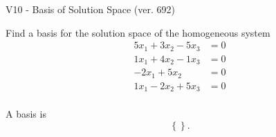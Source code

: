 \begin{exercise}
  \begin{exerciseTitle}V10 - Basis of Solution Space (ver. 692)\end{exerciseTitle}
  \begin{exerciseStatement}
    Find a basis for the solution space of the homogeneous system 
\begin{align*}
 5 x_ 1 + 3 x_ 2 -5 x_ 3 &= 0  \\ 
  1 x_ 1 + 4 x_ 2 -1 x_ 3 &= 0  \\ 
  -2 x_ 1 + 5 x_ 2 &= 0  \\ 
  1 x_ 1 -2 x_ 2 + 5 x_ 3 &= 0  \\ 
 \end{align*}


 
  \end{exerciseStatement}

  \begin{exerciseAnswer}
   A basis is   
\[\left\{\right\}.\]

  


  \end{exerciseAnswer}
\end{exercise}